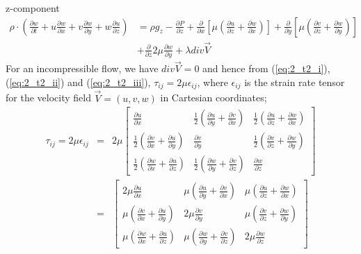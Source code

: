 \documentclass[11pt]{report}
\newcommand{\spn}[1]{\\[#1cm]}
\newcommand{\refn}[1]{(\ref{#1})}
\newcommand{\refx}[1]{\refn{eq:#1}}
\begin{document}
	z-component
	\begin{eqnarray*}
		\rho \cdot \left(\frac{\partial w}{\partial t} + u\frac{\partial w}{\partial x} + v\frac{\partial w}{\partial y} + w\frac{\partial u}{\partial z}\right) &= \rho g_z - \frac{\partial P}{\partial z} + \frac{\partial }{\partial x}\left[\mu\left(\frac{\partial u}{\partial z} + \frac{\partial w}{\partial x}\right)\right] + \frac{\partial}{\partial y}\left[\mu\left(\frac{\partial v}{\partial z} + \frac{\partial w}{\partial y}\right)\right]\\
		& + \frac{\partial }{\partial z}2\mu\frac{\partial w}{\partial y} + \lambda div\vec{V}
	\end{eqnarray*}
	For an incompressible flow, we have $div\vec{V} = 0$ and hence from \refx{2_t2_i}, \refx{2_t2_ii} and \refx{2_t2_iii}, $\tau_{ij} = 2\mu\epsilon_{ij}$, where $\epsilon_{ij}$ is the strain rate tensor for the velocity field $\vec{V} = (u,v,w)$ in Cartesian coordinates;
	\begin{eqnarray*}
		\tau_{ij} = 2\mu\epsilon_{ij} &=& 2\mu\begin{bmatrix}
			\frac{\partial u}{\partial x} & \frac{1}{2}\left(\frac{\partial u}{\partial y} + \frac{\partial v}{\partial x}\right) & \frac{1}{2}\left(\frac{\partial u}{\partial z} + \frac{\partial w}{\partial x}\right)\spn{0.4}
			\frac{1}{2}\left(\frac{\partial v}{\partial x}+\frac{\partial u}{\partial y}\right) & \frac{\partial v}{\partial y}  & \frac{1}{2}\left(\frac{\partial v}{\partial z} + \frac{\partial w}{\partial y}\right)\spn{0.4}
			\frac{1}{2}\left(\frac{\partial w}{\partial x} + \frac{\partial u}{\partial z}\right) & \frac{1}{2}\left(\frac{\partial w}{\partial y}+\frac{\partial v}{\partial z}\right) & \frac{\partial w}{\partial z}
		\end{bmatrix}\spn{0.6}
		&=& \begin{bmatrix}
			2\mu\frac{\partial u}{\partial x} & \mu\left(\frac{\partial u}{\partial y} + \frac{\partial v}{\partial x}\right) & \mu\left(\frac{\partial u}{\partial z} + \frac{\partial w}{\partial x}\right)\spn{0.4}
			\mu\left(\frac{\partial v}{\partial x} + \frac{\partial u}{\partial y}\right) & 2\mu\frac{\partial v}{\partial y} & \mu\left(\frac{\partial v}{\partial z} + \frac{\partial w}{\partial y}\right)\spn{0.4}
			\mu\left(\frac{\partial w}{\partial x}+ \frac{\partial u}{\partial z}\right) & \mu\left(\frac{\partial w}{\partial y}+ \frac{\partial v}{\partial z}\right) & 2\mu\frac{\partial w}{\partial z}
		\end{bmatrix}
	\end{eqnarray*} 
\end{document}
